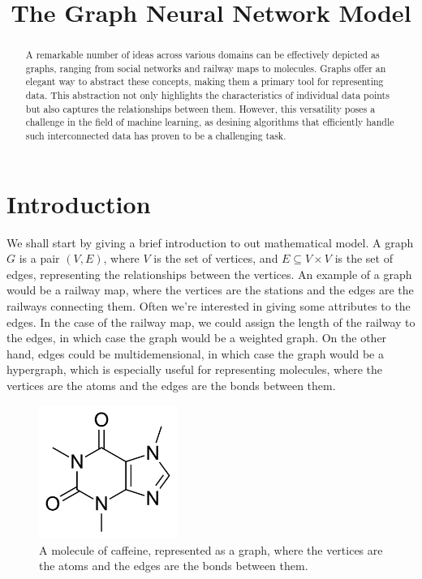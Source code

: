 \documentclass[12pt]{article}
\begin{document}
\title{The Graph Neural Network Model}
\date{\vspace{-5ex}}

\maketitle

\begin{abstract}
    A remarkable number of ideas across various domains can be effectively
    depicted as graphs, ranging from social networks and railway maps to
    molecules. Graphs offer an elegant way to abstract these concepts, making
    them a primary tool for representing data. This abstraction not only
    highlights the characteristics of individual data points but also captures
    the relationships between them. However, this versatility poses a challenge
    in the field of machine learning, as desining algorithms that efficiently
    handle such interconnected data has proven to be a challenging task.
\end{abstract}

\section{Introduction}
      We  shall  start  by  giving a brief introduction to out mathematical model. A
    graph  $G$  is  a  pair  $(V,  E)$,  where  $V$  is  the set of vertices, and $E
    \subseteq  V  \times  V$  is  the  set  of edges, representing the relationships
    between  the  vertices.  An  example  of  a  graph would be a railway map, where
    the  vertices  are  the  stations  and  the  edges  are  the railways connecting
    them.  Often  we're  interested  in  giving some attributes to the edges. In the
    case  of  the  railway  map,  we  could  assign the length of the railway to the
    edges,  in  which  case  the graph would be a weighted graph. On the other hand,
    edges   could   be  multidemensional,  in  which  case  the  graph  would  be  a
    hypergraph,  which  is  especially  useful for representing molecules, where the
    vertices are the atoms and the edges are the bonds between them.

     \begin{figure}[h]
         \centering
         \includegraphics[width=0.4\textwidth]{img/Caffeine_structure.png}
           \caption{A   molecule   of  caffeine,  represented  as  a  graph,  where  the
        vertices are the atoms and the edges are the bonds between them.}
         \label{fig:graph}
     \end{figure}
    
\end{document}
